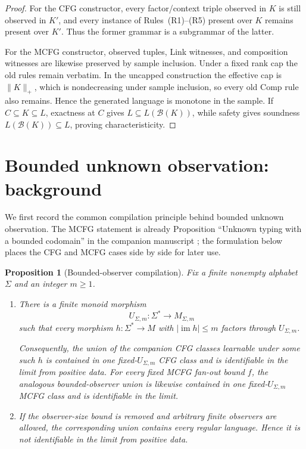 \documentclass[11pt]{article}
\newtheorem{proposition}[theorem]{Proposition}
\theoremstyle{definition}
\theoremstyle{remark}
\newcommand{\im}{\operatorname{im}}
\begin{document}
\begin{proof}
For the CFG constructor, every factor/context triple observed in \(K\) is
still observed in \(K'\), and every instance of Rules~(R1)--(R5) present
over \(K\) remains present over \(K'\).  Thus the former grammar is a
subgrammar of the latter.

For the MCFG constructor, observed tuples, Link witnesses, and composition
witnesses are likewise preserved by sample inclusion.  Under a fixed rank cap
the old rules remain verbatim.  In the uncapped construction the effective cap
is \(\|K\|_+\), which is nondecreasing under sample inclusion, so every old
Comp rule also remains.  Hence the generated language is monotone in the
sample.  If \(C\subseteq K\subseteq L\), exactness at \(C\) gives
\(L\subseteq L(\mathcal B(K))\), while safety gives soundness
\(L(\mathcal B(K))\subseteq L\), proving characteristicity.
\end{proof}
\section{Bounded unknown observation: background}
\label{sec:threshold}

We first record the common compilation principle behind bounded unknown
observation.  The MCFG statement is already Proposition ``Unknown typing with
a bounded codomain'' in the companion manuscript \cite{KuriyamaMCFG}; the
formulation below places the CFG and MCFG cases side by side for later use.

\begin{proposition}[Bounded-observer compilation]
\label{thm:threshold}
Fix a finite nonempty alphabet \(\Sigma\) and an integer \(m\ge1\).

\begin{enumerate}[label=(\roman*),leftmargin=*]
\item There is a finite monoid morphism
\[
 U_{\Sigma,m}:\Sigma^*\to M_{\Sigma,m}
\]
such that every morphism \(h:\Sigma^*\to M\) with \(|\im h|\le m\)
factors through \(U_{\Sigma,m}\).

Consequently, the union of the companion CFG classes learnable under some
such \(h\) is contained in one fixed-\(U_{\Sigma,m}\) CFG class and is
identifiable in the limit from positive data.  For every fixed MCFG fan-out
bound \(f\), the analogous bounded-observer union is likewise contained in one
fixed-\(U_{\Sigma,m}\) MCFG class and is identifiable in the limit.

\item If the observer-size bound is removed and arbitrary finite observers are
allowed, the corresponding union contains every regular language.  Hence it
is not identifiable in the limit from positive data.
\end{enumerate}
\end{proposition}
\end{document}
